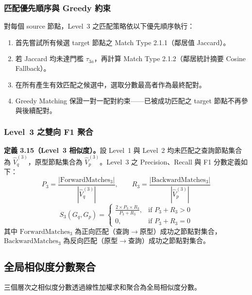 \begin{ZhChapter}
\subsubsection{匹配優先順序與 Greedy 約束}

對每個 source 節點，Level~3 之匹配策略依以下優先順序執行：
\begin{enumerate}
    \item 首先嘗試所有候選 target 節點之 Match Type 2.1.1（鄰居值 Jaccard）。
    \item 若 Jaccard 均未達門檻 $\tau_{3a}$，再計算 Match Type 2.1.2（鄰居統計摘要 Cosine Fallback）。
    \item 在所有產生有效匹配之候選中，選取分數最高者作為最終配對。
    \item Greedy Matching 保證一對一配對約束——已被成功匹配之 target 節點不再參與後續配對。
\end{enumerate}


\subsubsection{Level~3 之雙向 F1 聚合}

\noindent\textbf{定義 3.15（Level~3 相似度）。}設 Level~1 與 Level~2 均未匹配之查詢節點集合為 $\hat{V}_q^{(3)}$，原型節點集合為 $\hat{V}_p^{(3)}$。Level~3 之 Precision、Recall 與 F1 分數定義如下：
\begin{equation}
    P_3 = \frac{|\text{ForwardMatches}_3|}{|\hat{V}_q^{(3)}|}, \qquad R_3 = \frac{|\text{BackwardMatches}_3|}{|\hat{V}_p^{(3)}|}
    \label{eq:l3-pr}
\end{equation}
\begin{equation}
    S_3(G_q, G_p) = \begin{cases} \displaystyle\frac{2 \times P_3 \times R_3}{P_3 + R_3}, & \text{if } P_3 + R_3 > 0 \\[8pt] 0, & \text{if } P_3 + R_3 = 0 \end{cases}
    \label{eq:level3}
\end{equation}
其中 $\text{ForwardMatches}_3$ 為正向匹配（查詢$\rightarrow$原型）成功之節點對集合，$\text{BackwardMatches}_3$ 為反向匹配（原型$\rightarrow$查詢）成功之節點對集合。


\subsection{全局相似度分數聚合}
\label{subsec:global-score}

三個層次之相似度分數透過線性加權求和聚合為全局相似度分數。


\end{ZhChapter}
